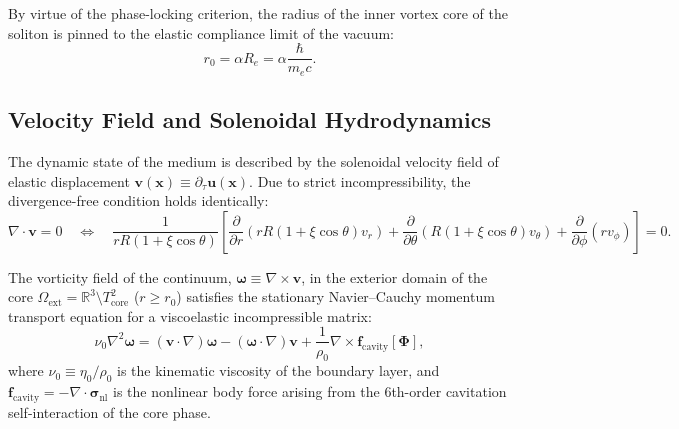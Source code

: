 \documentclass[12pt,a4paper]{article}
\begin{document}
	By virtue of the phase-locking criterion, the radius of the inner vortex core of the soliton is pinned to the elastic compliance limit of the vacuum:
	\begin{equation}
		r_0 = \alpha R_e = \alpha \frac{\hbar}{m_e c}.
	\end{equation}
	
	\subsection{Velocity Field and Solenoidal Hydrodynamics}
	The dynamic state of the medium is described by the solenoidal velocity field of elastic displacement $\mathbf{v}(\mathbf{x}) \equiv \partial_\tau \mathbf{u}(\mathbf{x})$. Due to strict incompressibility, the divergence-free condition holds identically:
	\begin{equation}
		\nabla \cdot \mathbf{v} = 0 \quad \Longleftrightarrow \quad \frac{1}{r R(1+\xi\cos\theta)} \left[ \frac{\partial}{\partial r}\left( r R (1+\xi\cos\theta) v_r \right) + \frac{\partial}{\partial \theta}\left( R(1+\xi\cos\theta) v_\theta \right) + \frac{\partial}{\partial \phi}\left( r v_\phi \right) \right] = 0.
	\end{equation}
	
	The vorticity field of the continuum, $\boldsymbol{\omega} \equiv \nabla \times \mathbf{v}$, in the exterior domain of the core $\Omega_{\text{ext}} = \mathbb{R}^3 \setminus T^2_{\text{core}}$ ($r \ge r_0$) satisfies the stationary Navier--Cauchy momentum transport equation for a viscoelastic incompressible matrix:
	\begin{equation}
		\nu_0 \nabla^2 \boldsymbol{\omega} = (\mathbf{v} \cdot \nabla)\boldsymbol{\omega} - (\boldsymbol{\omega} \cdot \nabla)\mathbf{v} + \frac{1}{\rho_0} \nabla \times \mathbf{f}_{\text{cavity}}[\boldsymbol{\Phi}],
		\label{eq:navier_cauchy_vorticity}
	\end{equation}
	where $\nu_0 \equiv \eta_0 / \rho_0$ is the kinematic viscosity of the boundary layer, and $\mathbf{f}_{\text{cavity}} = -\nabla \cdot \boldsymbol{\sigma}_{\text{nl}}$ is the nonlinear body force arising from the 6th-order cavitation self-interaction of the core phase.
	
\end{document}
